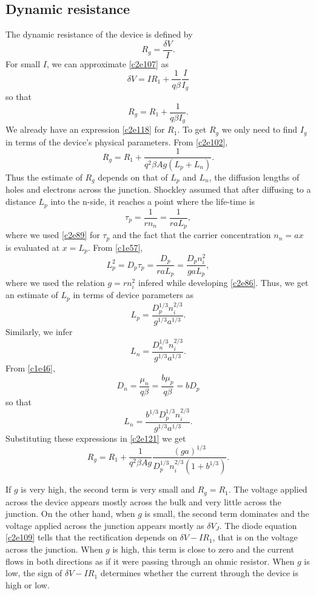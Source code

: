 \subsection{Dynamic resistance}
The dynamic resistance of the device is defined by
\begin{equation}\label{c2e119}
R_g = \frac{\delta V}{I}.
\end{equation}
For small $I$, we can approximate \eqref{c2e107} as
\[
\delta V = IR_1 + \frac{1}{q\beta}\frac{I}{I_g}
\]
so that
\begin{equation}\label{c2e120}
R_g = R_1 + \frac{1}{q\beta I_g}.
\end{equation}
We already have an expression \eqref{c2e118} for $R_1$. To get $R_g$ we only 
need to find $I_g$ in terms of the device's physical parameters. From 
\eqref{c2e102}, 
\begin{equation}\label{c2e121}
R_g = R_1 + \frac{1}{q^2\beta Ag(L_p + L_n)}.
\end{equation}
Thus the estimate of $R_g$ depends on that of $L_p$ and $L_n$, the diffusion
lengths of holes and electrons across the junction. Shockley 
\cite{shockley1949theory} assumed that after diffusing to a distance $L_p$ into 
the n-side, it reaches a point where the life-time is
\[
\tau_p = \frac{1}{rn_n} = \frac{1}{raL_p},
\]
where we used \eqref{c2e89} for $\tau_p$ and the fact that the carrier 
concentration $n_n = ax$ is evaluated at $x=L_p$. From \eqref{c1e57},
\[
L_p^2 = D_p\tau_p =  \frac{D_p}{raL_p} = \frac{D_pn_i^2}{gaL_p},
\]
where we used the relation $g=rn_i^2$ infered while developing \eqref{c2e86}.
Thus, we get an estimate of $L_p$ in terms of device parameters as
\begin{equation}\label{c2e122}
L_p = \frac{D_p^{1/3}n_i^{2/3}}{g^{1/3}a^{1/3}}.
\end{equation}
Similarly, we infer
\begin{equation}\label{c2e123}
L_n = \frac{D_n^{1/3}n_i^{2/3}}{g^{1/3}a^{1/3}}.
\end{equation}
From \eqref{c1e46}, 
\[
D_n = \frac{\mu_n}{q\beta} = \frac{b\mu_p}{q\beta} = bD_p
\]
so that
\begin{equation}\label{c2e124}
L_n = \frac{b^{1/3}D_p^{1/3}n_i^{2/3}}{g^{1/3}a^{1/3}}.
\end{equation}
Substituting these expressions in \eqref{c2e121} we get
\begin{equation}\label{c2e125}
R_g = R_1 + \frac{1}{q^2\beta Ag}
\frac{(ga)^{1/3}}{D_p^{1/3}n_i^{2/3}(1 + b^{1/3})}.
\end{equation}

If $g$ is very high, the second term is very small and $R_g = R_1$. The voltage
applied across the device appears mostly across the bulk and very little across
the junction. On the other hand, when $g$ is small, the second term dominates
and the voltage applied across the junction appears mostly as $\delta V_J$. 
The diode equation \eqref{c2e109} tells that the rectification depends on
$\delta V - IR_1$, that is on the voltage across the junction. When $g$ is
high, this term is close to zero and the current flows in both directions as
if it were passing through an ohmic resistor. When $g$ is low, the sign of
$\delta V - IR_1$ determines whether the current through the device is high or 
low.
